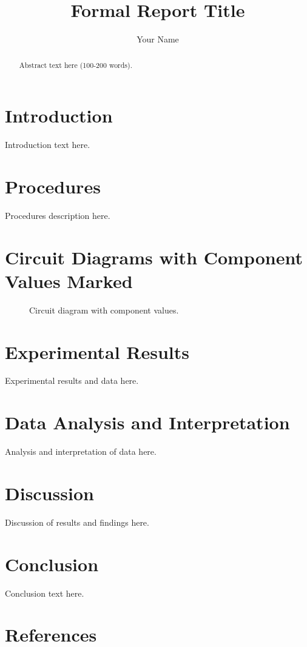 \documentclass[journal]{IEEEtran}
\begin{document}
\title{Formal Report Title}
\author{Your Name}
\maketitle

\begin{abstract}
Abstract text here (100-200 words).
\end{abstract}

\section{Introduction}
Introduction text here.

\section{Procedures}
Procedures description here.

\section{Circuit Diagrams with Component Values Marked}
\begin{figure}[htbp]
    \centering
    \caption{Circuit diagram with component values.}
\end{figure}

\section{Experimental Results}
Experimental results and data here.

\section{Data Analysis and Interpretation}
Analysis and interpretation of data here.

\section{Discussion}
Discussion of results and findings here.

\section{Conclusion}
Conclusion text here.

\section{References}
\end{document}
